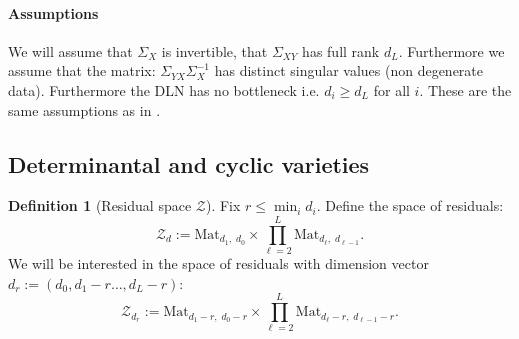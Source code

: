 \documentclass{article}
\theoremstyle{definition}
\newtheorem{definition}[theorem]{Definition}
\begin{document}
\paragraph{Assumptions} We will assume that $\Sigma_X$ is invertible, that $\Sigma_{XY}$ has full rank $d_L$. Furthermore we assume that the matrix: $\Sigma_{YX}\Sigma_X^{-1}$ has distinct singular values (non degenerate data). Furthermore the DLN has no bottleneck i.e. $d_i \geq d_L$ for all $i$. These are the same assumptions as in \cite{achour2024loss}. 
\subsection{Determinantal and cyclic varieties}
\begin{definition}[Residual space $\mathcal Z$]
Fix $r \le \min_i d_i$. Define the space of residuals:
\[
\mathcal Z_{d}
:=
\mathrm{Mat}_{d_1 ,\; d_0}
\times
\prod_{\ell=2}^{L   }
\mathrm{Mat}_{d_\ell ,\; d_{\ell-1} }.
\]
We will be interested in the space of residuals with dimension vector $d_r:=(d_0, d_1-r\dots,d_L-r)$:
\[
\mathcal Z_{d_r}
:=
\mathrm{Mat}_{d_1-r ,\; d_0-r}
\times
\prod_{\ell=2}^{L   }\mathrm{Mat}_{d_\ell-r ,\; d_{\ell-1}-r }.
\]
\end{definition}
\end{document}
